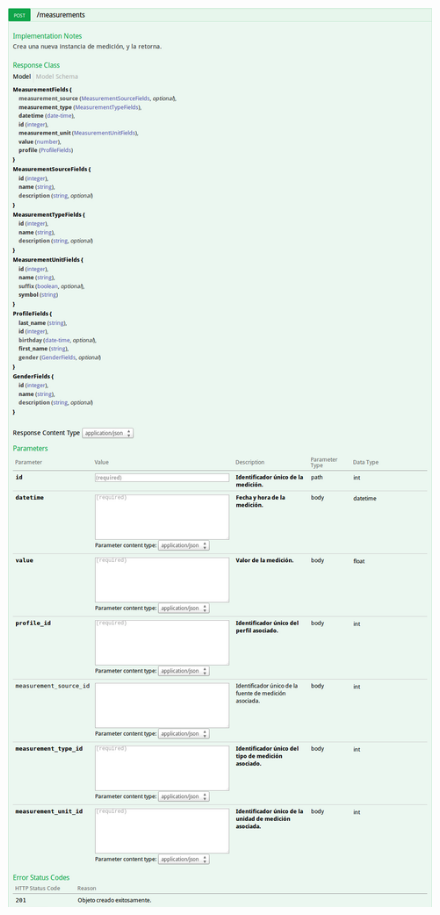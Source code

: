 \begin{figure}[h]
  \centering
  \includegraphics[width=\textwidth,height=.75\textheight,keepaspectratio]{img/especificacion_api/measurementList_post}
  \label{measurementList_post}
\end{figure}

